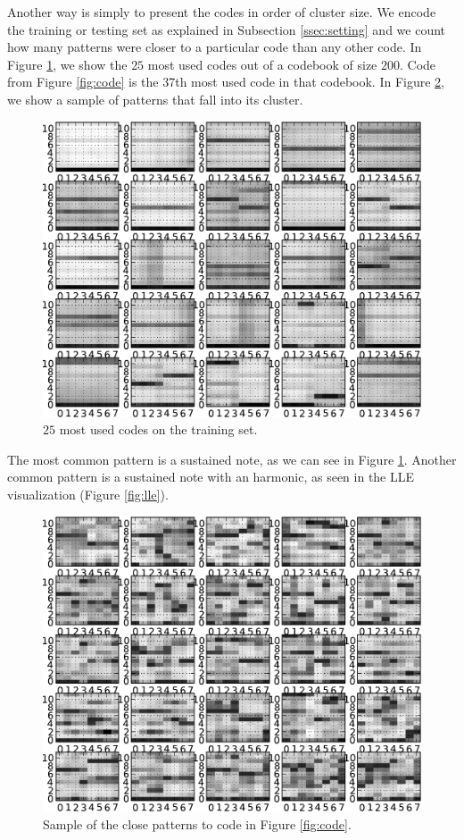 \documentclass{article}
\begin{document}
Another way is simply to present the codes in order of cluster size.
We encode the training or testing set as explained in Subsection 
\ref{ssec:setting} and we count how many patterns were closer to a particular
code than any other code. In Figure \ref{fig:firstcodes}, we show the $25$
most used codes out of a codebook of size $200$.
Code from Figure \ref{fig:code} is the 37th most used code in that
codebook. In Figure \ref{fig:closep}, we show a sample of patterns that
fall into its cluster.


\begin{figure}[htb]
\begin{center}
\includegraphics[width=.9\columnwidth]{codes1}
\end{center}
\caption{{$25$ most used codes on the training set.}}
\label{fig:firstcodes}
\end{figure}

The most common pattern is a sustained note, as we can see in Figure
\ref{fig:firstcodes}. Another common pattern is a sustained note
with an harmonic, as seen in the LLE visualization (Figure \ref{fig:lle}).

\begin{figure}[htb]
\begin{center}
\includegraphics[width=.9\columnwidth]{close_patterns1}
\end{center}
\caption{{Sample of the close patterns to code in Figure \ref{fig:code}.}}
\label{fig:closep}
\end{figure}
\end{document}
